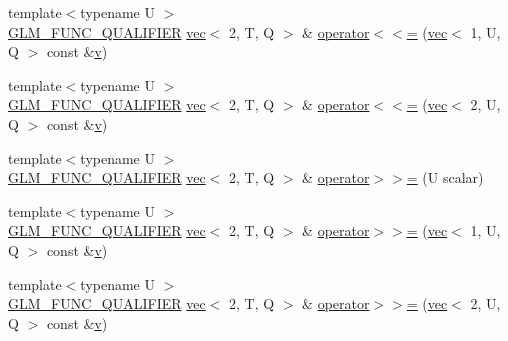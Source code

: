 \begin{DoxyCompactItemize}
\item 
{\footnotesize template$<$typename U $>$ }\\\hyperlink{setup_8hpp_a33fdea6f91c5f834105f7415e2a64407}{G\+L\+M\+\_\+\+F\+U\+N\+C\+\_\+\+Q\+U\+A\+L\+I\+F\+I\+ER} \hyperlink{structglm_1_1vec}{vec}$<$ 2, T, Q $>$ \& \hyperlink{structglm_1_1vec_3_012_00_01_t_00_01_q_01_4_a4423f3d6021ce069241999d4e7829c9d}{operator$<$$<$=} (\hyperlink{structglm_1_1vec}{vec}$<$ 1, U, Q $>$ const \&\hyperlink{_s_d_l__opengl_8h_a10a82eabcb59d2fcd74acee063775f90}{v})
\item 
{\footnotesize template$<$typename U $>$ }\\\hyperlink{setup_8hpp_a33fdea6f91c5f834105f7415e2a64407}{G\+L\+M\+\_\+\+F\+U\+N\+C\+\_\+\+Q\+U\+A\+L\+I\+F\+I\+ER} \hyperlink{structglm_1_1vec}{vec}$<$ 2, T, Q $>$ \& \hyperlink{structglm_1_1vec_3_012_00_01_t_00_01_q_01_4_a3bbdd09fd3976b858078dc1157cecf19}{operator$<$$<$=} (\hyperlink{structglm_1_1vec}{vec}$<$ 2, U, Q $>$ const \&\hyperlink{_s_d_l__opengl_8h_a10a82eabcb59d2fcd74acee063775f90}{v})
\item 
{\footnotesize template$<$typename U $>$ }\\\hyperlink{setup_8hpp_a33fdea6f91c5f834105f7415e2a64407}{G\+L\+M\+\_\+\+F\+U\+N\+C\+\_\+\+Q\+U\+A\+L\+I\+F\+I\+ER} \hyperlink{structglm_1_1vec}{vec}$<$ 2, T, Q $>$ \& \hyperlink{structglm_1_1vec_3_012_00_01_t_00_01_q_01_4_aece22b772eb31903dd637c069c2aee82}{operator$>$$>$=} (U scalar)
\item 
{\footnotesize template$<$typename U $>$ }\\\hyperlink{setup_8hpp_a33fdea6f91c5f834105f7415e2a64407}{G\+L\+M\+\_\+\+F\+U\+N\+C\+\_\+\+Q\+U\+A\+L\+I\+F\+I\+ER} \hyperlink{structglm_1_1vec}{vec}$<$ 2, T, Q $>$ \& \hyperlink{structglm_1_1vec_3_012_00_01_t_00_01_q_01_4_a9831eed973635e3d4cea367592355f63}{operator$>$$>$=} (\hyperlink{structglm_1_1vec}{vec}$<$ 1, U, Q $>$ const \&\hyperlink{_s_d_l__opengl_8h_a10a82eabcb59d2fcd74acee063775f90}{v})
\item 
{\footnotesize template$<$typename U $>$ }\\\hyperlink{setup_8hpp_a33fdea6f91c5f834105f7415e2a64407}{G\+L\+M\+\_\+\+F\+U\+N\+C\+\_\+\+Q\+U\+A\+L\+I\+F\+I\+ER} \hyperlink{structglm_1_1vec}{vec}$<$ 2, T, Q $>$ \& \hyperlink{structglm_1_1vec_3_012_00_01_t_00_01_q_01_4_a7ef73d8384eeb47fd2a2afbd897cb06a}{operator$>$$>$=} (\hyperlink{structglm_1_1vec}{vec}$<$ 2, U, Q $>$ const \&\hyperlink{_s_d_l__opengl_8h_a10a82eabcb59d2fcd74acee063775f90}{v})
\end{DoxyCompactItemize}
